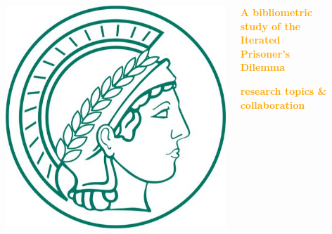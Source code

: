 \documentclass[usenames,dvipsnames,t]{beamer}
\begin{document}
\begin{columns}
    \begin{column}{.02\linewidth}
    \end{column}
    \begin{column}{.1\linewidth}
        \vspace{1cm}

        \begin{center}
        \includegraphics[width=.7\textwidth]{static/mpi.jpg}
        \end{center}
    \end{column}
    \begin{column}{.7\linewidth}
    \vspace{1.5cm}

    \centering
    \vspace{1cm}
    \textbf{\textcolor{orange}{\Huge A bibliometric study of the Iterated Prisoner's Dilemma}}
    \vspace{1cm}

    \textbf{\Large\textcolor{orange}{research topics \& collaboration}}
    \end{column}
    \begin{column}{.1\linewidth}
        \vspace{1cm}


\end{column}
\end{columns}
\end{document}
